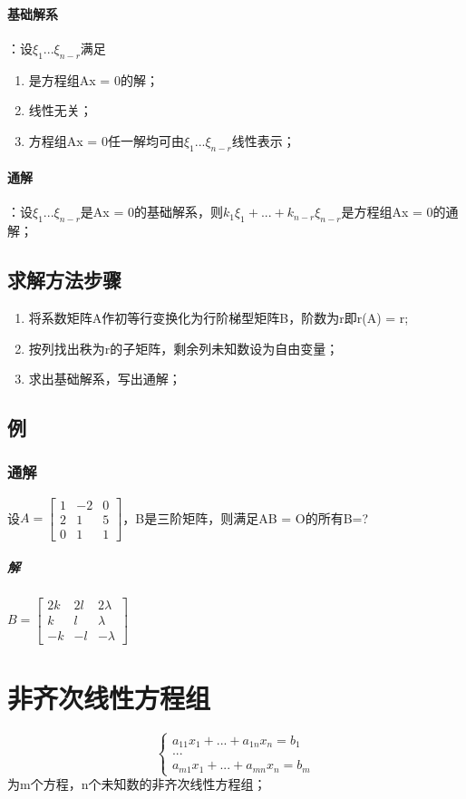 \paragraph{基础解系}
：设\(\xi_1...\xi_{n - r}\)满足\begin{enumerate}
    \item 是方程组Ax = 0的解；
    \item 线性无关；
    \item 方程组Ax = 0任一解均可由\(\xi_1...\xi_{n - r}\)线性表示；
\end{enumerate}

\paragraph{通解}
：设\(\xi_1...\xi_{n - r}\)是Ax = 0的基础解系，则\(k_1\xi_1 + ... + k_{n - r}\xi_{n - r}\)是方程组Ax = 0的通解；

\subsection{求解方法步骤}
\begin{enumerate}
    \item 将系数矩阵A作初等行变换化为行阶梯型矩阵B，阶数为r即r(A) = r;
    \item 按列找出秩为r的子矩阵，剩余列未知数设为自由变量；
    \item 求出基础解系，写出通解；
\end{enumerate}


\subsection{例}

\subsubsection{通解}
设\(A = \begin{bmatrix}
    1 & -2 & 0 \\ 
    2 & 1 & 5 \\ 
    0 & 1 & 1
\end{bmatrix}\)，B是三阶矩阵，则满足AB = O的所有B=?
\subparagraph{解}
\(B = \begin{bmatrix}
    2k & 2l & 2\lambda \\ 
    k & l & \lambda \\ 
    -k & -l & -\lambda
\end{bmatrix}\)


\section{非齐次线性方程组}
\[
\begin{cases}
a_{11}x_1 + ... + a_{1n}x_n = b_1 \\ 
... \\ 
a_{m1}x_1 + ... + a_{mn}x_n = b_m
\end{cases}
\]为m个方程，n个未知数的非齐次线性方程组；

